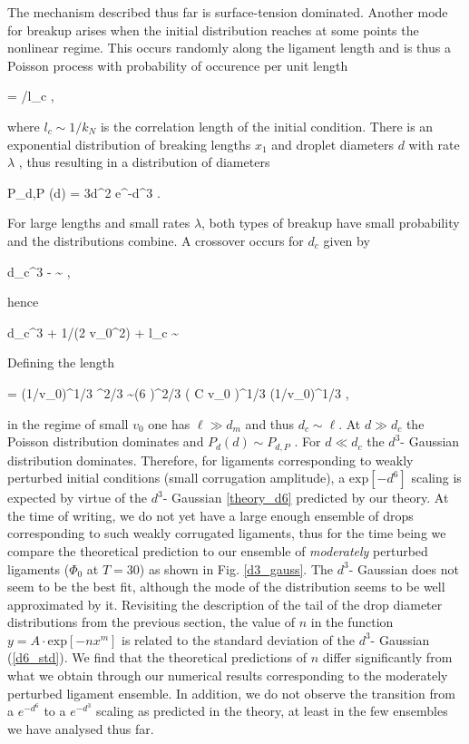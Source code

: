 The mechanism described thus far is surface-tension dominated. 
Another mode for breakup arises when the initial distribution reaches 
at some points the nonlinear regime. This occurs randomly along
the ligament length and is thus a Poisson process with probability of 
occurence per unit length

\be
\lambda = \exp[{-1/(2 v_0^2)}]/l_c \label{p3} , 
\nd

where $l_c \sim 1/k_N$ is the correlation length of the initial condition. There is an exponential distribution
of breaking lengths $x_1$ and droplet diameters $d$ with rate $\lambda$ , thus resulting in a distribution of diameters

\be
  P_{d,P} (d) = {3d^2} \lambda e^{-\lambda d^3} \label{PP} .
\nd

For large lengths and small rates $\lambda$, both types of breakup have small probability and the distributions
  combine. A crossover occurs for $d_c$ given by

\be
  {\lambda d_c^3} - \ln \lambda  \sim {} , 
\nd

hence

\be
  {\lambda d_c^3} + 1/(2 v_0^2) + \ln l_c \sim {} 
\nd 

Defining the length

\be
  \ell = (1/v_0)^{1/3} \sigma^{2/3} \sim   (6  \pi)^{2/3} \left(  {C \ln v_0} \right)^{1/3}  (1/v_0)^{1/3} , 
\nd

in the regime of small $v_0$ one has $\ell \gg d_m$ and thus $d_c \sim \ell$. At $d \gg d_c$ the Poisson distribution
dominates and $P_d(d) \sim P_{d,P}$ . 
For $d \ll d_c$ the $d^3$- Gaussian distribution dominates. 
Therefore, for ligaments corresponding to weakly perturbed initial 
conditions (small corrugation amplitude), a $\textrm{exp}[-d^6]$ 
scaling is expected by virtue of the $d^3$- Gaussian \eqref{theory_d6} predicted by our theory.   
At the time of writing, we do not yet have a large enough ensemble of drops
corresponding to such weakly corrugated ligaments, thus for the time being 
we compare the theoretical prediction to our ensemble of \textit{moderately} 
perturbed ligaments ($\Phi_0$ at $T=30$) as shown in Fig. \ref{d3_gauss}.
The $d^3$- Gaussian does not seem to be the best fit, although  
the mode of the distribution seems to be well approximated by it. 
Revisiting the description of the tail of the drop diameter distributions from 
the previous section, the value of $n$ in the function $y = A\cdot \textrm{exp}[-nx^m]$
is related to the standard deviation of the $d^3$- Gaussian (\eqref{d6_std}). 
We find that the theoretical predictions of $n$ differ significantly 
from what we obtain through our numerical results corresponding to the moderately perturbed ligament ensemble. 
In addition, we do not observe the transition from a $e^{-d^6}$ to a $e^{-d^3}$ scaling 
as predicted in the theory, at least in the few ensembles we have analysed thus far. 

